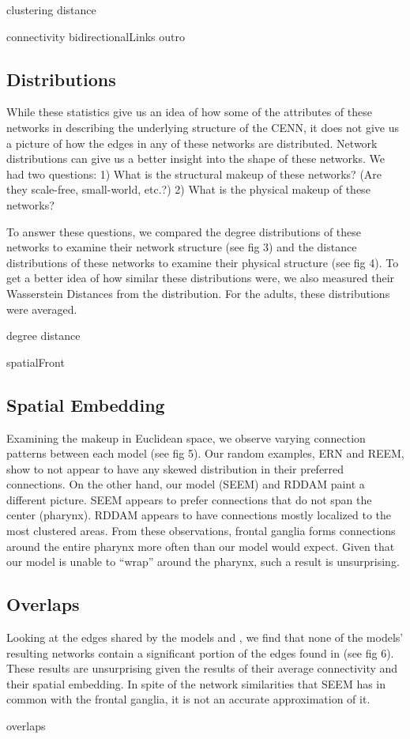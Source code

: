 {clustering}
{distance}

{connectivity}
{bidirectionalLinks}
{outro}

\subsection{Distributions}

While these statistics give us an idea of how some of the attributes of these networks in describing the underlying structure of the CENN, it does not give us a picture of how the edges in any of these networks are distributed. 
Network distributions can give us a better insight into the shape of these networks.
We had two questions: 
1) What is the structural makeup of these networks? (Are they scale-free, small-world, etc.?) 
2) What is the physical makeup of these networks?

To answer these questions, we compared the degree distributions of these networks to examine their network structure (see fig 3) and the distance distributions of these networks to examine their physical structure (see fig 4). 
To get a better idea of how similar these distributions were, we also measured their Wasserstein Distances from the \ce distribution. 
For the adults, these distributions were averaged.

{degree}
{distance}

{spatialFront}

\subsection{Spatial Embedding} %
Examining the makeup in Euclidean space, we observe varying connection patterns between each model (see fig 5). 
Our random examples, ERN and REEM, show to not appear to have any skewed distribution in their preferred connections. 
On the other hand, our model (SEEM) and RDDAM paint a different picture. 
SEEM appears to prefer connections that do not span the center (pharynx). 
RDDAM appears to have connections mostly localized to the most clustered areas.
From these observations, \ce frontal ganglia forms connections around the entire pharynx more often than our model would expect.
Given that our model is unable to ``wrap'' around the pharynx, such a result is unsurprising.

\subsection{Overlaps} %
Looking at the edges shared by the models and \ce, we find that none of the models' resulting networks contain a significant portion of the edges found in \ce (see fig 6). 
These results are unsurprising given the results of their average connectivity and their spatial embedding.
In spite of the network similarities that SEEM has in common with the \ce frontal ganglia, it is not an accurate approximation of it.

{overlaps}